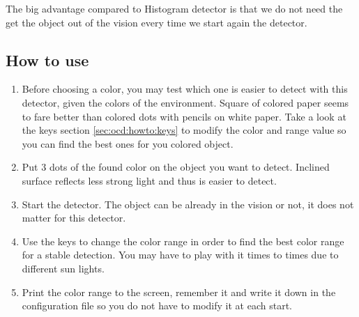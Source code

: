 The big advantage compared to Histogram detector is that we do not need 
the get the object out of the vision every time we start again the 
detector. 


\subsection{How to use}
\label{sec:ocd:howto}
    \begin{enumerate}
        \item Before choosing a color, you may test which one is easier 
        to detect with this detector, given the colors of the environment. 
        Square of colored paper seems to fare better than colored 
        dots with pencils on white paper. Take a look at the keys section
        \ref{sec:ocd:howto:keys} to modify the color and range value so
        you can find the best ones for you colored object.
        \item Put 3 dots of the found color on the object you want to 
        detect. Inclined surface reflects less strong light 
            and thus is easier to detect.
        \item Start the detector. The object can be already in the vision 
        or not, it does not matter for this detector. 
        \item Use the keys to change the color range in order to find the 
        best color range for a stable detection. You may have to play
        with it times to times due to different sun lights. 
        \item Print the color range to the screen, remember it and write 
        it down in the configuration file so you do not have to modify it 
        at each start.
    \end{enumerate}


